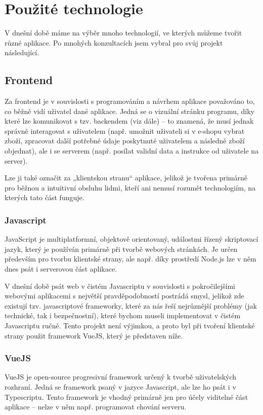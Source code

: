 \chapter{Použité technologie}
V dnešní době máme na výběr mnoho technologií, ve kterých můžeme tvořit různé aplikace. Po mnohých konzultacích jsem vybral pro svůj projekt následující. 

\section{Frontend}
Za frontend je v souvislosti s programováním a návrhem aplikace považováno to, co běžně vidí uživatel dané aplikace. Jedná se o vizuální stránku programu, díky které lze komunikovat s tzv. backendem (viz dále) – to znamená, že musí jednak správně interagovat s uživatelem (např. umožnit uživateli si v e-shopu vybrat zboží, zpracovat další potřebné údaje poskytnuté uživatelem a následně zboží objednat), ale i se serverem (např. posílat validní data a instrukce od uživatele na server).

Lze ji také označit za „klientskou stranu“ aplikace, jelikož je tvořena primárně pro běžnou a intuitivní obsluhu lidmi, kteří ani nemusí rozumět technologiím, na kterých tato část funguje. \cite{FEvsBE}

	\subsection{Javascript}
	JavaScript je multiplatformní, objektově orientovaný, událostmi řízený skriptovací jazyk, který je používán primárně při tvorbě webových stránkách. Je určen především pro tvorbu klientské strany, ale např. díky prostředí Node.js lze v něm dnes psát i serverovou část aplikace. \cite{JS1} \cite{JS2}
	
	V dnešní době psát web v čistém Javascriptu v souvislosti s pokročilejšími webovými aplikacemi s největší pravděpodobností postrádá smysl, jelikož zde existují tzv. javascriptové frameworky, které za nás řeší nejrůznější problémy (jak technické, tak i bezpečnostní), které bychom museli implementovat v čistém Javascriptu ručně. Tento projekt není výjimkou, a proto byl při tvoření klientské strany použit framework VueJS, který je představen níže.
	
	\subsection{VueJS}
	VueJS je open-source progresivní framework určený k tvorbě uživatelských rozhraní. Jedná se framework psaný v jazyce Javascript, ale lze ho psát i v Typescriptu. Tento framework je vhodný primárně jen pro účely viditelné část aplikace – nelze v něm např. programovat chování serveru. \cite{VueJS1}
	
